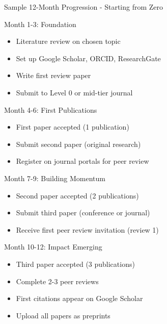 \documentclass[11pt]{beamer}
\begin{document}
				\begin{frame}{Sample 12-Month Progression - Starting from Zero}
					\scriptsize
					\begin{block}{Month 1-3: Foundation}
						\begin{itemize}
							\item Literature review on chosen topic
							\item Set up Google Scholar, ORCID, ResearchGate
							\item Write first review paper
							\item Submit to Level 0 or mid-tier journal
						\end{itemize}
					\end{block}
					\begin{block}{Month 4-6: First Publications}
						\begin{itemize}
							\item First paper accepted (1 publication)
							\item Submit second paper (original research)
							\item Register on journal portals for peer review
						\end{itemize}
					\end{block}
					\begin{block}{Month 7-9: Building Momentum}
						\begin{itemize}
							\item Second paper accepted (2 publications)
							\item Submit third paper (conference or journal)
							\item Receive first peer review invitation (review 1)
						\end{itemize}
					\end{block}
					\begin{block}{Month 10-12: Impact Emerging}
						\begin{itemize}
							\item Third paper accepted (3 publications)
							\item Complete 2-3 peer reviews
							\item First citations appear on Google Scholar
							\item Upload all papers as preprints
						\end{itemize}
					\end{block}
				\end{frame}
				
\end{document}
